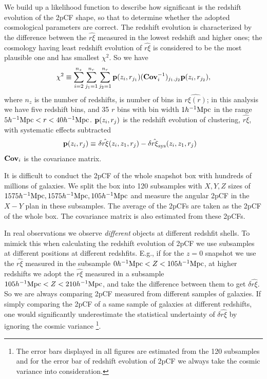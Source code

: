 \documentclass[iop]{emulateapj}
\begin{document}
We build up a likelihood function to 
describe how significant is the redshift evolution of the 2pCF shape,
so that to determine whether the adopted cosmological parameters are correct.
The redshift evolution is characterized by the difference between the $\hat{r\xi}$ measured in the lowest redshift and higher ones;
the cosmology having least redshift evolution of $\hat{r\xi}$ is considered to be the most plausible one and has smallest $\chi^2$.
So we have
\begin{equation}\label{eq:chisq1}
\chi^2\equiv \sum_{i=2}^{n_{z}} \sum_{j_1=1}^{n_{r}} \sum_{j_2=1}^{n_{r}} {\bf p}(z_i,r_{j_1}) ({\bf Cov}_{i}^{-1})_{j_1,j_2}  {\bf p}(z_i,r_{j_2}),
\end{equation}
where $n_z$ is the number of redshifts, 
is number of bins in $\hat{r\xi(r)}$;
in this analysis we have five redshift bins, 
and 35 $r$ bins with bin width $1h^{-1}\rm Mpc$ in the range $5h^{-1}{\rm Mpc}<r<40h^{-1}{\rm Mpc}$.
${\bf p}(z_i,r_{j})$ is the redshift evolution of clustering, 
$\hat {r\xi}$, with systematic effects subtracted
\begin{eqnarray}\label{eq:bfp}
 {\bf p}(z_i,r_{j}) \equiv&\ \delta \hat{r\xi}(z_i,z_1,r_j) - \delta \hat{r\xi}_{\rm sys}(z_i,z_1,r_j)
\end{eqnarray}
${\bf Cov}_i$ is the covariance matrix.

It is difficult to conduct the 2pCF of the whole snapshot box with hundreds of millions of galaxies.
We split the box into 120 subsamples with $X,Y,Z$ sizes of $1575h^{-1}{\rm Mpc},1575h^{-1}{\rm Mpc}, 105h^{-1}{\rm Mpc}$
and measure the angular 2pCF in the $X-Y$ plan in these subsamples. 
The average of the 2pCFs are taken as the 2pCF of the whole box.
The covariance matrix is also estimated from these 2pCFs.

In real observations we observe {\it different} objects at different redshfit shells.
To mimick this when calculating the redshift evolution of 2pCF we use subsamples at different positions at different redshfits.
E.g., if for the $z=0$ snapshot we use the $\hat{r\xi}$ measured in the subsample $0h^{-1}{\rm Mpc}<Z<105 h^{-1}{\rm Mpc}$,
at higher redshifts we adopt the $\hat{r\xi}$ measured in a subsample $105h^{-1}{\rm Mpc}<Z<210 h^{-1}{\rm Mpc}$,
and take the difference between them to get $\delta \hat{r\xi}$.
So we are always comparing 2pCF measured from different samples of galaxies.
If simply comparing the 2pCF of a same sample of galaxies at different redshifts, 
one would significantly underestimate the statistical undertainty of $\delta \hat{r\xi}$ by ignoring the cosmic variance
\footnote{The error bars displayed in all figures are estimated from the 120 subsamples and for the error bar of redshift evolution of 2pCF 
we always take the cosmic variance into consideration.}.
\end{document}
